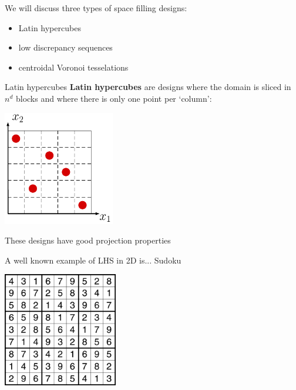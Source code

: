 \documentclass{beamer}
\begin{document}
\begin{frame}{}
We will discuss three types of space filling designs:
\begin{itemize}
	\item Latin hypercubes
	\item low discrepancy sequences
	\item centroidal Voronoi tesselations
\end{itemize}
\end{frame}

\begin{frame}{Latin hypercubes}
\textbf{Latin hypercubes} are designs where the domain is sliced in $n^d$ blocks and where there is only one point per `column':
\begin{center}
\includegraphics[height=5cm]{figures/latexdraw/lhs1}
\end{center}
These designs have good projection properties
\end{frame}


\begin{frame}{}
A well known example of LHS in 2D is... \pause Sudoku
\vspace{5mm}
\begin{center}
\includegraphics[height=5cm]{figures/sudoku}
\end{center}
\end{frame}
\end{document}
